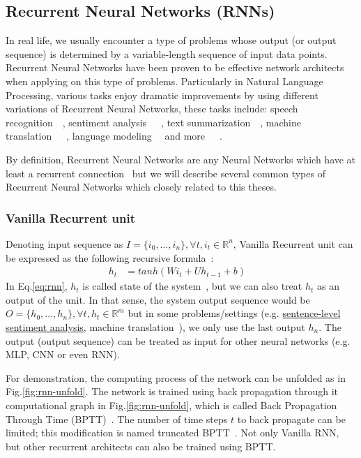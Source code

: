 \subsection{Recurrent Neural Networks (RNNs)}\label{sec:RNN}
In real life, we usually encounter a type of problems whose output (or output sequence) is determined by a variable-length sequence of input data points.
Recurrent Neural Networks have been proven to be effective network architects when applying on this type of problems.
Particularly in Natural Language Processing, various tasks enjoy dramatic improvements by using different variations of Recurrent Neural Networks, these tasks include:  speech recognition~\cite{speech-lstm}~\cite{MiaoGM15}, sentiment analysis~\cite{treeLSTM}~\cite{cnn-rnn}~\cite{attention-gru}, text summarization~\cite{RushCW15}~\cite{NallapatiXZ16}, machine translation~\cite{FiratCB16}~\cite{SutskeverVL14}~\cite{BritzGLL17}, language modeling~\cite{mikolov-nlm}~\cite{JozefowiczVSSW16} and more~\cite{deep-nlp}~\cite{Schmidhuber14}~\cite{deeplearning-book}.

By definition, Recurrent Neural Networks are any Neural Networks which have at least a recurrent connection~\cite{rnn-def} but we will describe several common types of Recurrent Neural Networks which closely related to this theses.

\subsubsection{Vanilla Recurrent unit}\label{sec:vanilla-rnn}
Denoting input sequence as \(I = \{i_0,\ldots,i_n\}, \forall t, i_t \in \mathbb{R}^n\), Vanilla Recurrent unit can be expressed as the following recursive formula~\cite{treeLSTM}:
\begin{align}
      h_t &= tanh(Wi_t + Uh_{t-1} + b)&\label{eq:rnn}
\end{align}
In Eq.\ref{eq:rnn}, \(h_t\) is called state of the system~\cite{deeplearning-book}, but we can also treat \(h_t\) as an output of the unit.
In that sense, the system output sequence would be \(O = \{h_0,\ldots,h_n\}, \forall t, h_t \in \mathbb{R}^m\) but in some problems/settings (e.g. \hyperref[sec:sent-level]{sentence-level sentiment analysis}, machine translation~\cite{SutskeverVL14}), we only use the last output \(h_n\).
The output (output sequence) can be treated as input for other neural networks (e.g. MLP, CNN or even RNN).

For demonstration, the computing process of the network can be unfolded as in Fig.\ref{fig:rnn-unfold}.
The network is trained using back propagation through it computational graph in Fig.\ref{fig:rnn-unfold}, which is called Back Propagation Through Time (BPTT)~\cite{BPTT}.
The number of time steps \(t\) to back propagate can be limited; this modification is named truncated BPTT~\cite{truncatedBPTT}.
Not only Vanilla RNN, but other recurrent architects can also be trained using BPTT.

